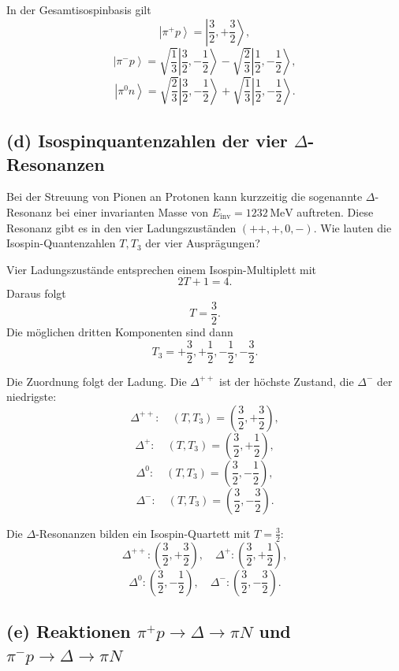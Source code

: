 \documentclass[11pt,a4paper]{scrartcl}
\newcommand{\ket}[1]{\left|#1\right\rangle}
\begin{document}
\begin{answerbox}
In der Gesamtisospinbasis gilt
\[
\boxed{\ket{\pi^+p}=\ket{\frac32,+\frac32}},
\]
\[
\boxed{\ket{\pi^-p}=\sqrt{\frac13}\ket{\frac32,-\frac12}
-\sqrt{\frac23}\ket{\frac12,-\frac12}},
\]
\[
\boxed{\ket{\pi^0n}=\sqrt{\frac23}\ket{\frac32,-\frac12}
+\sqrt{\frac13}\ket{\frac12,-\frac12}}.
\]
\end{answerbox}

\subsection*{(d) Isospinquantenzahlen der vier $\Delta$-Resonanzen}

Bei der Streuung von Pionen an Protonen kann kurzzeitig die sogenannte $\Delta$-Resonanz bei einer invarianten Masse von $E_{\mathrm{inv}}=1232\,\mathrm{MeV}$ auftreten. Diese Resonanz gibt es in den vier Ladungszuständen $(++, +, 0, -)$. Wie lauten die Isospin-Quantenzahlen $T,T_3$ der vier Ausprägungen?

\begin{calculationbox}
Vier Ladungszustände entsprechen einem Isospin-Multiplett mit
\[
2T+1=4.
\]
Daraus folgt
\[
T=\frac32.
\]
Die möglichen dritten Komponenten sind dann
\[
T_3=+\frac32,+\frac12,-\frac12,-\frac32.
\]

\begin{calculationbox}
Die Zuordnung folgt der Ladung. Die $\Delta^{++}$ ist der höchste Zustand, die $\Delta^-$ der niedrigste:
\[
\Delta^{++}:\quad \left(T,T_3\right)=\left(\frac32,+\frac32\right),
\]
\[
\Delta^{+}:\quad \left(T,T_3\right)=\left(\frac32,+\frac12\right),
\]
\[
\Delta^{0}:\quad \left(T,T_3\right)=\left(\frac32,-\frac12\right),
\]
\[
\Delta^{-}:\quad \left(T,T_3\right)=\left(\frac32,-\frac32\right).
\]
\end{calculationbox}
\end{calculationbox}

\begin{answerbox}
Die $\Delta$-Resonanzen bilden ein Isospin-Quartett mit $T=\frac32$:
\[
\boxed{\Delta^{++}:\left(\frac32,+\frac32\right)},
\quad
\boxed{\Delta^{+}:\left(\frac32,+\frac12\right)},
\]
\[
\boxed{\Delta^{0}:\left(\frac32,-\frac12\right)},
\quad
\boxed{\Delta^{-}:\left(\frac32,-\frac32\right)}.
\]
\end{answerbox}

\subsection*{(e) Reaktionen $\pi^+p\to\Delta\to\pi N$ und $\pi^-p\to\Delta\to\pi N$}
\end{document}
